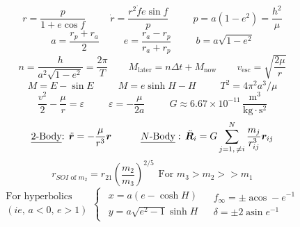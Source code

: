\documentclass[twocolumn]{article}    %
\begin{document}
\begin{equation*}
    r = \frac{p}{1+e\cos f} \hspace{30pt}  \dot{r} = \frac{r^2\dot{f} e \sin f}{p} \hspace{30pt} p = a(1-e^2) = \frac{h^2}{\mu} 
\end{equation*}
\begin{equation*}
    a = \frac{r_p+r_a}{2} \hspace{30pt} e = \frac{r_a-r_p}{r_a+r_p} \hspace{30pt} b = a\sqrt{1-e^2}
\end{equation*}
\begin{equation*}
     n = \frac{h}{a^2 \sqrt{1-e^2}} = \frac{2\pi}{T} \hspace{25pt}   M_{\operatorname{later}} = n \Delta t + M_{\operatorname{now}} \hspace{25pt} v_{\operatorname{esc}} = \sqrt{\frac{2\mu}{r}}
\end{equation*}
\begin{equation*}
    M = E - \sin E \hspace{30pt} M = e \sinh H - H \hspace{30pt} T^2 = 4\pi^2a^3/\mu
\end{equation*}
\begin{equation*}
    \frac{v^2}{2} -\frac{\mu}{r} = \varepsilon \hspace{30pt} \varepsilon = -\frac{\mu}{2a} \hspace{30pt} G \approx 6.67 \times 10^{-11}\, \frac{\text{m}^3}{\text{kg}\cdot \text{s}^2} 
\end{equation*}
\begin{equation*}
    \text{\underline{{2-Body}}: }\ddot{\bm{r}} = -\frac{\mu}{r^3}\bm{r} \hspace{30pt} \underline{N\text{-Body}}:\, \ddot{\bm{R}}_i = G\sum_{j=1,\, \neq i}^N \frac{m_j}{r_{ij}^3}\bm{r}_{ij} 
\end{equation*}
\begin{equation*}
     r_{SOI\text{ of } m_2} = r_{21} \left( \frac{m_2}{m_3}\right)^{2/5} \hspace{5pt}\text{For } m_3>m_2 >>m_1
\end{equation*}
\begin{equation*}
    \begin{matrix}
        \text{For hyperbolics }\\ (\textit{ie, }a<0,\, e> 1)     
    \end{matrix}
    \begin{cases}
        \begin{matrix}
        x = a(e- \cosh H)\\y = a\sqrt{e^2-1} \sinh H    
    \end{matrix} &
    \begin{matrix}
        f_\infty = \pm \operatorname{acos} -e^{-1}\\
        \delta = \pm 2 \operatorname{asin} e^{-1}
    \end{matrix}
    \end{cases}
\end{equation*}
\end{document}
